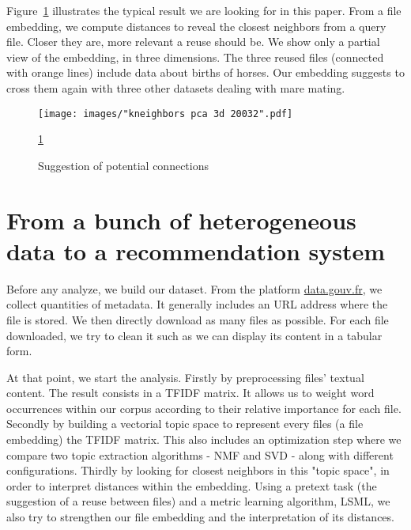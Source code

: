 \documentclass[a4paper]{article}
\begin{document}
	Figure~\ref{fig:introduction} illustrates the typical result we are looking for in this paper. From a file embedding, we compute distances to reveal the closest neighbors from a query file. Closer they are, more relevant a reuse should be. We show only a partial view of the embedding, in three dimensions. The three reused files (connected with orange lines) include data about births of horses. Our embedding suggests to cross them again with three other datasets dealing with mare mating. 
	
	\begin{figure}[]
		\texttt{[image: images/"kneighbors pca 3d 20032".pdf]}
		\caption{Suggestion of potential connections}
		\label{fig:introduction}
		\ref{fig:introduction}
	\end{figure}
	
	\section{From a bunch of heterogeneous data to a recommendation system}
	
	Before any analyze, we build our dataset. From the platform \href{http://www.data.gouv.fr/fr/}{data.gouv.fr}, we collect quantities of metadata. It generally includes an URL address where the file is stored. We then directly download as many files as possible. For each file downloaded, we try to clean it such as we can display its content in a tabular form.
	
	At that point, we start the analysis. Firstly by preprocessing files' textual content. The result consists in a \ac{TFIDF} matrix. It allows us to weight word occurrences within our corpus according to their relative importance for each file. Secondly by building a vectorial topic space to represent every files (a file embedding) the \ac{TFIDF} matrix. This also includes an optimization step where we compare two topic extraction algorithms - \ac{NMF} and \ac{SVD} - along with different configurations. Thirdly by looking for closest neighbors in this "topic space", in order to interpret distances within the embedding. Using a pretext task (the suggestion of a reuse between files) and a metric learning algorithm, \ac{LSML}, we also try to strengthen our file embedding and the interpretation of its distances.
	
\end{document}
